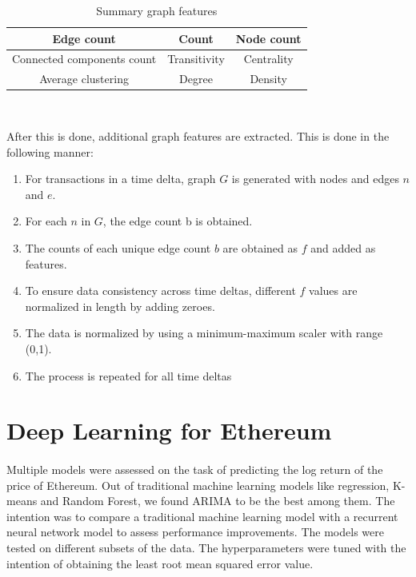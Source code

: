 \documentclass[12pt]{article}%
\begin{document}
 
\begin{center}
\begin{table}[h]
\centering
\begin{tabular}{ |c|c|c| } 
\hline
 Edge count & Count   & Node count \\ 
\hline 
Connected components count & Transitivity & Centrality \\
\hline
  Average clustering  & Degree & Density \\ 
 \hline
\end{tabular}
\\[10pt]
\caption{Summary graph features}
\end{table}
\end{center}



After this is done, additional graph features are extracted. This is done in the following manner: 

\begin{enumerate}[1:]
\item For transactions in a time delta, graph $G$ is generated with nodes and edges $n$ and $e$.
\item For each $n$ in $G$, the edge count b is obtained.
\item The counts of each unique edge count $b$ are obtained as $f$ and added as features.
\item To ensure data consistency across time deltas, different $f$ values are normalized in length by adding zeroes.
\item The data is normalized by using a minimum-maximum scaler with range (0,1).
\item The process is repeated for all time deltas

\end{enumerate}

\section{Deep Learning for Ethereum}
\paragraph{}Multiple models were assessed on the task of predicting the log return of the price of Ethereum. Out of traditional machine learning models like regression, K-means and Random Forest, we found ARIMA to be the best among them. The intention was to compare a traditional machine learning model with a recurrent neural network model to assess performance improvements. The models were tested on different subsets of the data. The hyperparameters were tuned with the intention of obtaining the least root mean squared error value.
\end{document}
